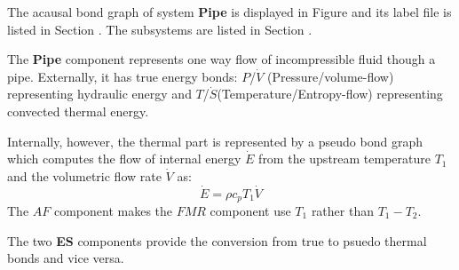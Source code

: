 

   The acausal bond graph of system \textbf{Pipe} is
   displayed in Figure  and its label
   file is listed in Section .
   The subsystems are listed in Section .

The \textbf{Pipe} component represents one way flow of incompressible
fluid though a pipe. Externally, it has true energy bonds: $P$/$\dot V$
(Pressure/volume-flow) representing hydraulic energy and $T$/$\dot
S$(Temperature/Entropy-flow) representing convected thermal energy.

Internally, however, the thermal part is represented by a pseudo bond
graph which computes the flow of internal energy $\dot E$ from the
upstream temperature $T_1$ and the volumetric flow rate $\dot V$ as:
\begin{equation}
  \dot E = \rho c_p T_1 \dot V
\end{equation}
The $AF$ component makes the $FMR$ component use $T_1$ rather than
$T_1-T_2$.

The two \textbf{ES} components provide the conversion from true to
psuedo thermal bonds and vice versa.


